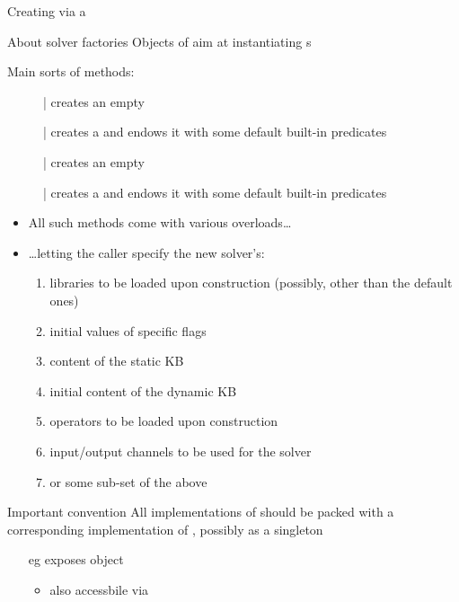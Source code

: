 \documentclass[handout]{beamer}
\begin{document}
\begin{frame}[allowframebreaks]{Creating  via a }
    \begin{block}{About solver factories}\centering
        Objects of  aim at instantiating s
    \end{block}

    \bigskip

    Main sorts of methods:
    \begin{description}
        \item[] | creates an empty 
        \item[] | creates a  and endows it with some default built-in predicates
        \item[] | creates an empty 
        \item[] | creates a  and endows it with some default built-in predicates
    \end{description}

    \framebreak
    
    \begin{itemize}
        \item All such methods come with various overloads\ldots
        \item \ldots letting the caller specify the new solver's:
        \begin{enumerate}
            \item libraries to be loaded upon construction (possibly, other than the default ones)
            \item initial values of specific flags
            \item content of the static KB
            \item initial content of the dynamic KB
            \item operators to be loaded upon construction
            \item input/output channels to be used for the solver
            \item or some sub-set of the above
        \end{enumerate}
    \end{itemize}

    \framebreak

    \begin{alertblock}{Important convention}\centering
        All implementations of  should be packed with a corresponding implementation of , possibly as a \alert{singleton}
    \end{alertblock}
    \begin{itemize}
        \item[eg]  exposes object 
        \begin{itemize}
            \item also accessbile via 
        \end{itemize} 


\end{itemize}
\end{frame}
\end{document}
